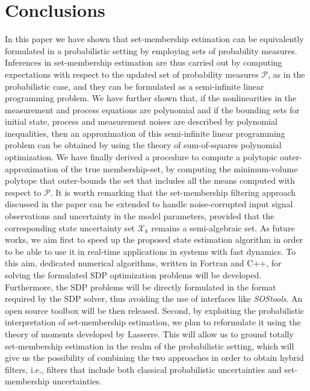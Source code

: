 \documentclass[twocolumn]{autart}
\newcommand{\DP}[1]{{#1}}
\begin{document}
\section{Conclusions}
In this paper we have shown that set-membership estimation can  be equivalently formulated in a probabilistic setting by employing sets of probability measures.
Inferences in set-membership estimation  are thus carried out by computing expectations \DP{with respect to}  the updated
set of probability measures $\mathcal{P}$, as in the probabilistic case, and they can be formulated as a semi-infinite linear programming problem.
We have further shown that, if the nonlinearities in the measurement and process equations are polynomial and if the bounding sets for initial state, process and measurement noises are described by polynomial inequalities, then an approximation of this semi-infinite linear programming problem can be obtained by using the theory of sum-of-squares polynomial optimization. We have finally derived a procedure to compute a polytopic outer-approximation of the true membership-set, by computing the  minimum-volume polytope
that outer-bounds the set that includes all the means computed \DP{with respect to}  $\mathcal{P}$.
\DP{It is worth remarking that the set-membership filtering approach discussed in the paper can be extended  to handle 
noise-corrupted input signal observations and uncertainty in the model parameters, provided that the corresponding state 
uncertainty set $\mathcal{X}_k$ remains a semi-algebraic set.} As future works, we aim first to speed up the proposed 
state estimation algorithm in order to be able to use it in real-time applications in systems with fast dynamics.
    \DP{To this aim, dedicated numerical algorithms, written in  Fortran and C++, for solving the formulated SDP optimization problems will be developed. Furthermore,}  the SDP problems will be directly formulated in the format required by the SDP solver, thus avoiding the use of interfaces like \emph{SOStools}. An open source toolbox will be then released.
Second, by exploiting the  probabilistic interpretation of set-membership estimation, we plan to reformulate it using the theory of moments developed by Lasserre. This will allow us to ground totally  set-membership estimation in the realm of the probabilistic setting, which will give us
the possibility of   combining the two approaches in order to obtain hybrid filters, i.e., filters that include both classical probabilistic uncertainties and
set-membership uncertainties.

\end{document}
